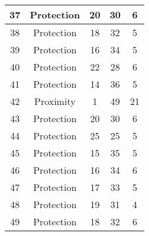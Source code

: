 \documentclass[results.tex]{subfiles}
\begin{document}
\begin{center}
\begin{tabular}{| c || c | c | c | c |}
            \hline
            37                      & Protection                   & 20                     & 30                      & 6                    \\
            \hline
            38                      & Protection                   & 18                     & 32                      & 5                    \\
            \hline
            39                      & Protection                   & 16                     & 34                      & 5                    \\
            \hline
            40                      & Protection                   & 22                     & 28                      & 6                    \\
            \hline
            41                      & Protection                   & 14                     & 36                      & 5                    \\
            \hline
            42                      & Proximity                    & 1                      & 49                      & 21                   \\
            \hline
            43                      & Protection                   & 20                     & 30                      & 6                    \\
            \hline
            44                      & Protection                   & 25                     & 25                      & 5                    \\
            \hline
            45                      & Protection                   & 15                     & 35                      & 5                    \\
            \hline
            46                      & Protection                   & 16                     & 34                      & 6                    \\
            \hline
            47                      & Protection                   & 17                     & 33                      & 5                    \\
            \hline
            48                      & Protection                   & 19                     & 31                      & 4                    \\
            \hline
            49                      & Protection                   & 18                     & 32                      & 6                    \\
            \hline
        \end{tabular}
    \end{center}
\end{document}
